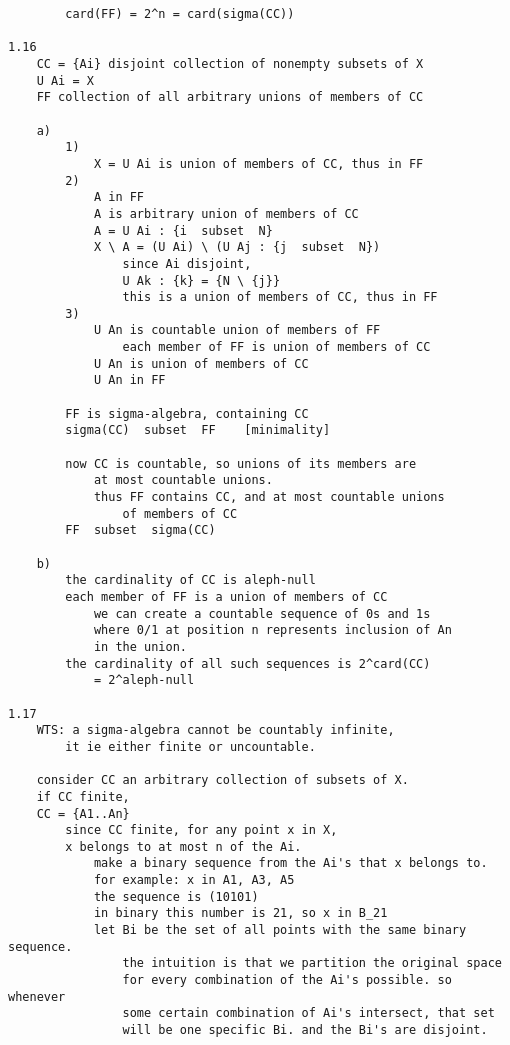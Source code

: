 \documentclass{article}
\begin{document}
\begin{flushleft}
\begin{verbatim}
        card(FF) = 2^n = card(sigma(CC))

1.16
    CC = {Ai} disjoint collection of nonempty subsets of X 
    U Ai = X 
    FF collection of all arbitrary unions of members of CC 

    a)
        1)
            X = U Ai is union of members of CC, thus in FF 
        2)
            A in FF 
            A is arbitrary union of members of CC 
            A = U Ai : {i  subset  N}
            X \ A = (U Ai) \ (U Aj : {j  subset  N})
                since Ai disjoint, 
                U Ak : {k} = {N \ {j}}
                this is a union of members of CC, thus in FF 
        3)
            U An is countable union of members of FF 
                each member of FF is union of members of CC 
            U An is union of members of CC 
            U An in FF 
        
        FF is sigma-algebra, containing CC 
        sigma(CC)  subset  FF    [minimality]

        now CC is countable, so unions of its members are 
            at most countable unions. 
            thus FF contains CC, and at most countable unions 
                of members of CC
        FF  subset  sigma(CC)
    
    b)
        the cardinality of CC is aleph-null 
        each member of FF is a union of members of CC 
            we can create a countable sequence of 0s and 1s
            where 0/1 at position n represents inclusion of An 
            in the union. 
        the cardinality of all such sequences is 2^card(CC)
            = 2^aleph-null

1.17
    WTS: a sigma-algebra cannot be countably infinite, 
        it ie either finite or uncountable. 
        
    consider CC an arbitrary collection of subsets of X. 
    if CC finite, 
    CC = {A1..An} 
        since CC finite, for any point x in X, 
        x belongs to at most n of the Ai. 
            make a binary sequence from the Ai's that x belongs to.
            for example: x in A1, A3, A5 
            the sequence is (10101)
            in binary this number is 21, so x in B_21
            let Bi be the set of all points with the same binary sequence. 
                the intuition is that we partition the original space 
                for every combination of the Ai's possible. so whenever 
                some certain combination of Ai's intersect, that set 
                will be one specific Bi. and the Bi's are disjoint.


\end{verbatim}
\end{flushleft}
\end{document}
